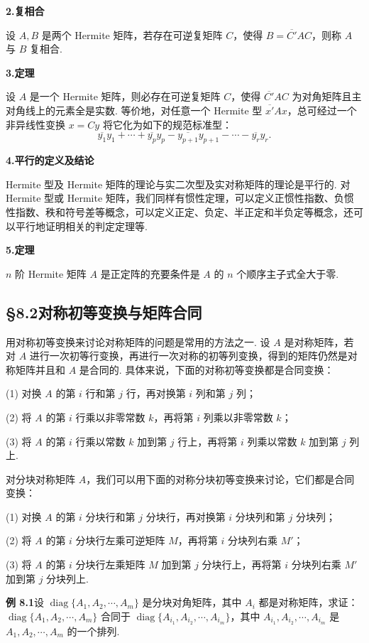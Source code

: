 \documentclass[UTF8, 12pt, fontset=fandol, oneside]{ctexart}
\begin{document}
\noindent\textbf{2.\quad 复相合}

设 $A,B$ 是两个 Hermite 矩阵，若存在可逆复矩阵 $C$，使得 $B=\overline{C'}AC$，则称 $A$ 与 $B$ 复相合.

\noindent\textbf{3.\quad 定理}

设 $A$ 是一个 Hermite 矩阵，则必存在可逆复矩阵 $C$，使得 $\overline{C'}AC$ 为对角矩阵且主对角线上的元素全是实数. 等价地，对任意一个 Hermite 型 $\overline{x'}Ax$，总可经过一个非异线性变换 $x=Cy$ 将它化为如下的规范标准型：
\[
\overline{y_1}y_1+\cdots+\overline{y_p}y_p-\overline{y_{p+1}}y_{p+1}-\cdots-\overline{y_r}y_r.
\]

\noindent\textbf{4.\quad 平行的定义及结论}

Hermite 型及 Hermite 矩阵的理论与实二次型及实对称矩阵的理论是平行的. 对 Hermite 型或 Hermite 矩阵，我们同样有惯性定理，可以定义正惯性指数、负惯性指数、秩和符号差等概念，可以定义正定、负定、半正定和半负定等概念，还可以平行地证明相关的判定定理等.

\noindent\textbf{5.\quad 定理}

$n$ 阶 Hermite 矩阵 $A$ 是正定阵的充要条件是 $A$ 的 $n$ 个顺序主子式全大于零.

\subsection*{§8.2\quad 对称初等变换与矩阵合同}

用对称初等变换来讨论对称矩阵的问题是常用的方法之一. 设 $A$ 是对称矩阵，若对 $A$ 进行一次初等行变换，再进行一次对称的初等列变换，得到的矩阵仍然是对称矩阵并且和 $A$ 是合同的. 具体来说，下面的对称初等变换都是合同变换：

(1) 对换 $A$ 的第 $i$ 行和第 $j$ 行，再对换第 $i$ 列和第 $j$ 列；

(2) 将 $A$ 的第 $i$ 行乘以非零常数 $k$，再将第 $i$ 列乘以非零常数 $k$；

(3) 将 $A$ 的第 $i$ 行乘以常数 $k$ 加到第 $j$ 行上，再将第 $i$ 列乘以常数 $k$ 加到第 $j$ 列上.

对分块对称矩阵 $A$，我们可以用下面的对称分块初等变换来讨论，它们都是合同变换：

(1) 对换 $A$ 的第 $i$ 分块行和第 $j$ 分块行，再对换第 $i$ 分块列和第 $j$ 分块列；

(2) 将 $A$ 的第 $i$ 分块行左乘可逆矩阵 $M$，再将第 $i$ 分块列右乘 $M'$；

(3) 将 $A$ 的第 $i$ 分块行左乘矩阵 $M$ 加到第 $j$ 分块行上，再将第 $i$ 分块列右乘 $M'$ 加到第 $j$ 分块列上.

\noindent\textbf{例 8.1}\quad 设 $\operatorname{diag}\{A_1,A_2,\cdots,A_m\}$ 是分块对角矩阵，其中 $A_i$ 都是对称矩阵，求证：$\operatorname{diag}\{A_1,A_2,\cdots,A_m\}$ 合同于 $\operatorname{diag}\{A_{i_1},A_{i_2},\cdots,A_{i_m}\}$，其中 $A_{i_1},A_{i_2},\cdots,A_{i_m}$ 是 $A_1,A_2,\cdots,A_m$ 的一个排列.
\end{document}
